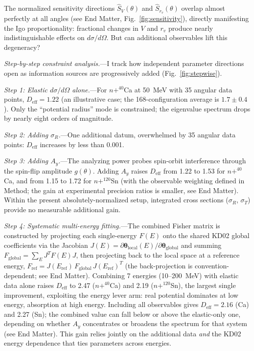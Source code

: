 \documentclass[aps,prl,reprint,superscriptaddress,showpacs,floatfix]{revtex4-2}
\begin{document}
The normalized sensitivity directions $\hat{S}_V(\theta)$ and $\hat{S}_{r_v}(\theta)$ overlap almost perfectly at all angles (see End Matter, Fig.~\ref{fig:sensitivity}), directly manifesting the Igo proportionality: fractional changes in $V$ and $r_v$ produce nearly indistinguishable effects on $d\sigma/d\Omega$. But can additional observables lift this degeneracy?

\textit{Step-by-step constraint analysis.}---I track how independent parameter directions open as information sources are progressively added (Fig.~\ref{fig:stepwise}).

\emph{Step 1: Elastic $d\sigma/d\Omega$ alone.}---For $n+^{40}$Ca at 50~MeV with 35 angular data points, $D_\mathrm{eff} = 1.22$ (an illustrative case; the 168-configuration average is $1.7 \pm 0.4$). Only the ``potential radius'' mode is constrained; the eigenvalue spectrum drops by nearly eight orders of magnitude.

\emph{Step 2: Adding $\sigma_R$.}---One additional datum, overwhelmed by 35 angular data points: $D_\mathrm{eff}$ increases by less than 0.001.

\emph{Step 3: Adding $A_y$.}---The analyzing power probes spin-orbit interference through the spin-flip amplitude $g(\theta)$. Adding $A_y$ raises $D_\mathrm{eff}$ from 1.22 to 1.53 for $n+^{40}$Ca, and from 1.15 to 1.72 for $n+^{120}$Sn (with the observable weighting defined in Method; the gain at experimental precision ratios is smaller, see End Matter). Within the present absolutely-normalized setup, integrated cross sections ($\sigma_R$, $\sigma_T$) provide no measurable additional gain.

\emph{Step 4: Systematic multi-energy fitting.}---The combined Fisher matrix is constructed by projecting each single-energy $F(E)$ onto the shared KD02 global coefficients via the Jacobian $J(E) = \partial\boldsymbol{\theta}_\mathrm{local}(E)/\partial\boldsymbol{\theta}_\mathrm{global}$ and summing $F_\mathrm{global} = \sum_E J^T F(E) J$, then projecting back to the local space at a reference energy, $F_\mathrm{ref} = J(E_\mathrm{ref})\,F_\mathrm{global}\,J(E_\mathrm{ref})^T$ (the back-projection is convention-dependent; see End Matter). Combining 7 energies (10--200~MeV) with elastic data alone raises $D_\mathrm{eff}$ to 2.47 ($n+^{40}$Ca) and 2.19 ($n+^{120}$Sn), the largest single improvement, exploiting the energy lever arm: real potential dominates at low energy, absorption at high energy. Including all observables gives $D_\mathrm{eff} = 2.16$ (Ca) and 2.27 (Sn); the combined value can fall below or above the elastic-only one, depending on whether $A_y$ concentrates or broadens the spectrum for that system (see End Matter). This gain relies jointly on the additional data \emph{and} the KD02 energy dependence that ties parameters across energies.
\end{document}
